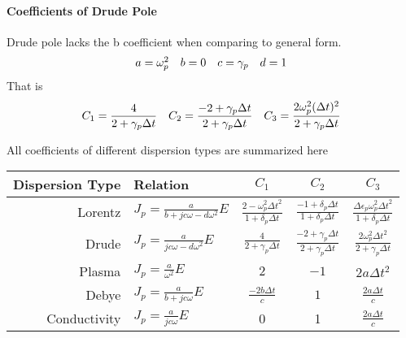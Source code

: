 \paragraph{\msjh Coefficients of Drude Pole}
Drude pole lacks the b coefficient when comparing to general form.
\begin{equation*}
  \begin{array}{@{}llll@{}}
    a = \omega_p^2 &
    b = 0 &
    c = \gamma_p &
    d = 1
  \end{array}
\end{equation*}
That is 
\begin{gather*}
  \begin{array}{@{}lll@{}}
    C_1 = \displaystyle\frac{4}{2+ \gamma_p\Delta t} &
    C_2 = \displaystyle\frac{-2+\gamma_p\Delta t}{2+\gamma_p\Delta t} &
    C_3 = \displaystyle\frac{2\omega_p^2(\Delta t)^2}{2+\gamma_p\Delta t}
  \end{array}
\end{gather*}





All coefficients of different dispersion types are summarized here
\begin{center}
  \begin{tabular}[c]{rlccc}
    \hline
    Dispersion Type & Relation & $C_1$ & $C_2$ & $C_3$ \\[0.1cm]
    \hline\noalign{\smallskip}
    Lorentz 
    & $J_p= \displaystyle\frac{a}{b + jc\omega - d\omega^2}E$ 
    & $\displaystyle\frac{2-\omega_p^2\Delta t^2}{1+\delta_p\Delta t}$ 
    & $\displaystyle\frac{-1 + \delta_p\Delta t}{1+\delta_p\Delta t}$  
    & $\displaystyle\frac{\Delta\epsilon_p\omega_p^2\Delta t^2}{1+\delta_p\Delta t}$ \\[0.5cm]

    Drude 
    & $J_p = \displaystyle\frac{a}{jc\omega - d\omega^2}E$ 
    & $\displaystyle\frac{ 4}{ 2+\gamma_p\Delta t}$ 
    & $\displaystyle\frac{ -2+\gamma_p\Delta t}{ 2+\gamma_p\Delta t}$ 
    & $\displaystyle\frac{ 2\omega_p^2\Delta t^2}{ 2+\gamma_p \Delta t}$\\[0.5cm]

    Plasma 
    & $J_p = \displaystyle\frac{a}{\omega^2} E$ 
    & $2$ 
    & $-1$ 
    & $2a\Delta t^2$\\[0.5cm]

    Debye
    & $J_p = \displaystyle\frac{a}{b+jc\omega} E$ 
    & $\displaystyle\frac{-2b\Delta t}{c}$ 
    & $1$ 
    & $\displaystyle\frac{2a\Delta t}{c}$\\[0.5cm]

    Conductivity
    & $J_p = \displaystyle\frac{a}{jc\omega}E$ 
    & 0 
    & 1 
    & $\displaystyle\frac{2a\Delta t}{c}$\\[0.3cm]
    \hline
  \end{tabular}
\end{center}


